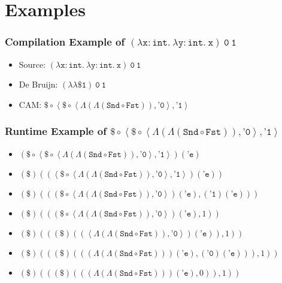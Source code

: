 \documentclass[aspectratio=169, draft]{beamer}
\begin{document}
\section{Examples}

\def\App{\mathtt{\$}}
\newcommand\Apply[2]{\left(#1\right)\left(#2\right)}
\newcommand\Compose[2]{#1\circ#2}
\newcommand\DPair[2]{\left(#1, #2\right)}
\def\Fst{\mathtt{Fst}}
\newcommand\Lam[1]{\Lambda\left(#1\right)}
\newcommand\Pair[2]{\left<#1, #2\right>}
\newcommand\Quote[1]{\texttt{'#1}}
\def\Snd{\mathtt{Snd}}

\begin{frame}
	\frametitle{Compilation Example of $\mathtt{\left(\lambda x:int.\ \lambda y:int.\ x\right)\ 0\ 1}$}
	\begin{itemize}[<+->]
		\item Source: $\mathtt{\left(\lambda x:int.\ \lambda y:int.\ x\right)\ 0\ 1}$
		\item De Bruijn: $\mathtt{\left(\lambda\lambda\$1\right)\ 0\ 1}$
		\item CAM: $\Compose{\App}{\Pair{\Compose{\App}{\Pair{\Lam{\Lam{\Compose{\Snd}{\Fst}}}}{\Quote{0}}}}{\Quote{1}}}$
	\end{itemize}
\end{frame}

\begin{frame}
	\frametitle{Runtime Example of $\Compose{\App}{\Pair{\Compose{\App}{\Pair{ \Lam{\Lam{\Compose{\Snd}{\Fst}}}}{\Quote{0}}}}{\Quote{1}}}$}
	\begin{itemize}[<+->]
		\item $\Apply{\Compose{\App}{\Pair{\Compose{\App}{\Pair{\Lam{\Lam{\Compose{\Snd}{\Fst}}}}{\Quote{0}}}}{\Quote{1}}}}{\Quote{e}}$
		\item $\Apply{\App}{\Apply{\Pair{\Compose{\App}{\Pair{\Lam{\Lam{\Compose{\Snd}{\Fst}}}}{\Quote{0}}}}{\Quote{1}}}{\Quote{e}}}$
		\item $\Apply{\App}{\DPair{
			\Apply{\Compose{\App}{\Pair{\Lam{\Lam{\Compose{\Snd}{\Fst}}}}{\Quote{0}}}}{\Quote{e}}
		}{\Apply{\Quote{1}}{\Quote{e}}}}$
		\item $\Apply{\App}{\DPair{
			\Apply{\Compose{\App}{\Pair{\Lam{\Lam{\Compose{\Snd}{\Fst}}}}{\Quote{0}}}}{\Quote{e}}
		}{1}}$
		\item $\Apply{\App}{\DPair{
			\Apply{\App}{\Apply{
				\Pair{\Lam{\Lam{\Compose{\Snd}{\Fst}}}
			}{
				\Quote{0}
			}}{\Quote{e}}}
		}{1}}$
		\item $\Apply{\App}{\DPair{
			\Apply{\App}{\DPair{
				\Apply{\Lam{\Lam{\Compose{\Snd}{\Fst}}}}{\Quote{e}}
			}{
				\Apply{\Quote{0}}{\Quote{e}}
			}}
		}{1}}$
		\item $\Apply{\App}{\DPair{
			\Apply{\App}{\DPair{
				\Apply{\Lam{\Lam{\Compose{\Snd}{\Fst}}}}{\Quote{e}}
			}{0}}
		}{1}}$
	\end{itemize}
\end{frame}
\end{document}

